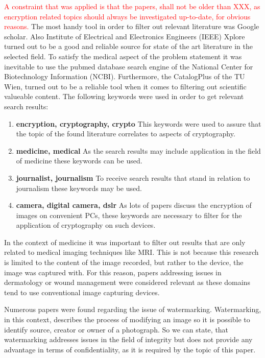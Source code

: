 \documentclass[12pt,a4paper,titlepage,oneside]{scrartcl}
\newcommand\todo[1]{\textcolor{red}{#1}}
\begin{document}
\todo{A constraint that was applied is that the papers, shall not be older than XXX, as encryption related topics should always be investigated up-to-date, for obvious reasons.}
The most handy tool in order to filter out relevant literature was Google scholar. 
Also Institute of Electrical and Electronics Engineers (IEEE) Xplore turned out to be a good and reliable source for state of the art literature in the selected field.
To satisfy the medical aspect of the problem statement it was inevitable to use the pubmed database search engine of the National Center for Biotechnology Information (NCBI).
Furthermore, the CatalogPlus of the TU Wien, turned out to be a reliable tool when it comes to filtering out scientific valueable content.
The following keywords were used in order to get relevant search results:
\begin{enumerate}
  \item  \textbf{encryption, cryptography, crypto}
  This keywords were used to assure that the topic of the found literature correlates to aspects of cryptography.
  \item  \textbf{medicine, medical}
  As the search results may include application in the field of medicine these keywords can be used.
  \item  \textbf{journalist, journalism}
  To receive search results that stand in relation to journalism these keywords may be used.
  \item \textbf{camera, digital camera, dslr}
  As lots of papers discuss the encryption of images on convenient PCs, these keywords are necessary to filter for the application of cryptography on such devices.
\end{enumerate}

In the context of medicine it was important to filter out results that are only related to medical imaging techniques like MRI.
This is not because this research is limited to the content of the image recorded, but rather to the device, the image was captured with.
For this reason, papers addressing issues in dermatology or wound management were considered relevant as these domains tend to use conventional image capturing devices.

Numerous papers were found regarding the issue of watermarking.
Watermarking, in this context, describes the process of modifying an image so it is possible to identify source, creator or owner of a photograph.
So we can state, that watermarking addresses issues in the field of integrity but does not provide any advantage in terms of confidentiality, as it is required by the topic of this paper.
\end{document}
